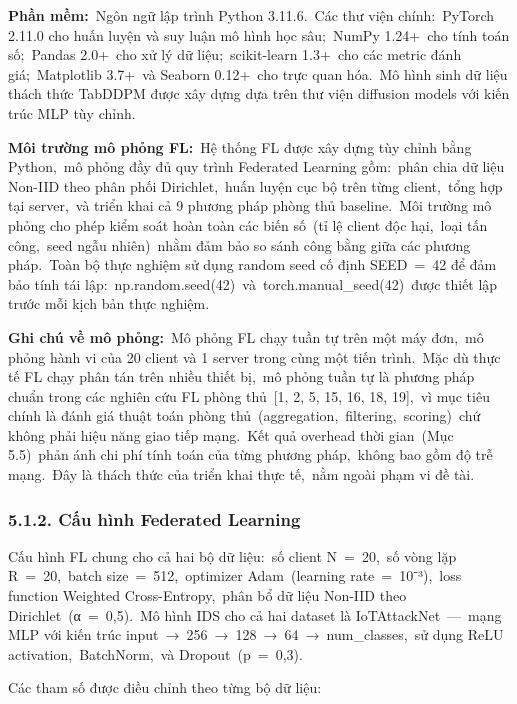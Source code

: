 \textbf{Phần mềm:}~Ngôn ngữ lập trình Python 3.11.6.~Các thư viện chính:~PyTorch 2.11.0 cho huấn luyện và suy luận mô hình học sâu;~NumPy 1.24+~cho tính toán số;~Pandas 2.0+~cho xử lý dữ liệu;~scikit-learn 1.3+~cho các metric đánh giá;~Matplotlib 3.7+~và Seaborn 0.12+~cho trực quan hóa.~Mô hình sinh dữ liệu thách thức TabDDPM được xây dựng dựa trên thư viện diffusion models với kiến trúc MLP tùy chỉnh.

\textbf{Môi trường mô phỏng FL:}~Hệ thống FL được xây dựng tùy chỉnh bằng Python,~mô phỏng đầy đủ quy trình Federated Learning gồm:~phân chia dữ liệu Non-IID theo phân phối Dirichlet,~huấn luyện cục bộ trên từng client,~tổng hợp tại server,~và triển khai cả 9 phương pháp phòng thủ baseline.~Môi trường mô phỏng cho phép kiểm soát hoàn toàn các biến số~(tỉ lệ client độc hại,~loại tấn công,~seed ngẫu nhiên)~nhằm đảm bảo so sánh công bằng giữa các phương pháp.~Toàn bộ thực nghiệm sử dụng random seed cố định SEED~=~42 để đảm bảo tính tái lập:~np.random.seed(42)~và~torch.manual\_seed(42)~được thiết lập trước mỗi kịch bản thực nghiệm.

\textbf{Ghi chú về mô phỏng:}~Mô phỏng FL chạy tuần tự trên một máy đơn,~mô phỏng hành vi của 20 client và 1 server trong cùng một tiến trình.~Mặc dù thực tế FL chạy phân tán trên nhiều thiết bị,~mô phỏng tuần tự là phương pháp chuẩn trong các nghiên cứu FL phòng thủ~{[}1, 2, 5, 15, 16, 18, 19{]},~vì mục tiêu chính là đánh giá thuật toán phòng thủ~(aggregation,~filtering,~scoring)~chứ không phải hiệu năng giao tiếp mạng.~Kết quả overhead thời gian~(Mục 5.5)~phản ánh chi phí tính toán của từng phương pháp,~không bao gồm độ trễ mạng.~Đây là thách thức của triển khai thực tế,~nằm ngoài phạm vi đề tài.

\subsubsection{5.1.2. Cấu hình Federated Learning}\label{cux1ea5u-huxecnh-federated-learning}

Cấu hình FL chung cho cả hai bộ dữ liệu:~số client N~=~20,~số vòng lặp R~=~20,~batch size~=~512,~optimizer Adam~(learning rate~=~10⁻³),~loss function Weighted Cross-Entropy,~phân bổ dữ liệu Non-IID theo Dirichlet~(α~=~0,5).~Mô hình IDS cho cả hai dataset là IoTAttackNet~---~mạng MLP với kiến trúc input~→~256~→~128~→~64~→~num\_classes,~sử dụng ReLU activation,~BatchNorm,~và Dropout~(p~=~0,3).

Các tham số được điều chỉnh theo từng bộ dữ liệu:

